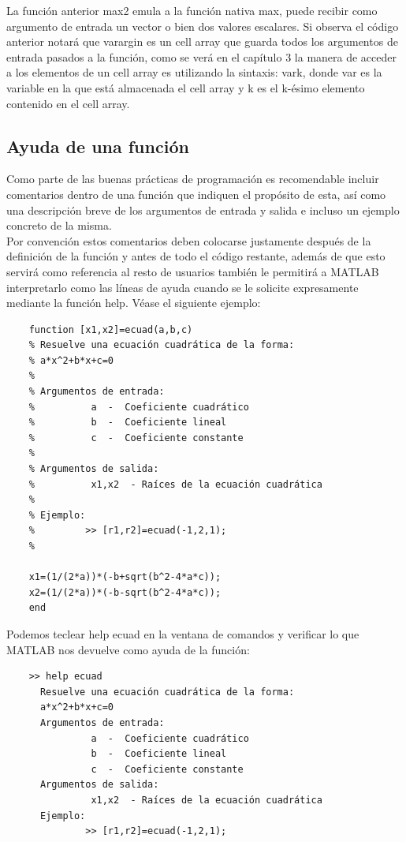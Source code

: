 La función anterior max2 emula a la función nativa  max, puede recibir como argumento 
de entrada un vector o bien dos valores escalares. Si observa el código anterior notará 
que varargin es un cell array que guarda todos los argumentos de entrada pasados a la 
función, como se verá en el capítulo 3 la manera de acceder a los elementos de un 
cell array es utilizando la sintaxis: var{k}, donde var es la variable en la que está 
almacenada el cell array y k es el k-ésimo elemento contenido en el cell array.

\subsection{Ayuda de una función}

Como parte de las buenas prácticas de programación es recomendable incluir comentarios 
dentro de una función que indiquen el propósito de esta, así como una descripción breve 
de los argumentos de entrada y salida e incluso un ejemplo concreto de la misma.\\

Por convención estos comentarios deben colocarse justamente después de la definición de 
la función y antes de todo el código restante, además de que esto servirá como referencia 
al resto de usuarios también le permitirá a MATLAB interpretarlo como las líneas de ayuda 
cuando se le solicite expresamente mediante la función help. Véase el siguiente ejemplo:

\begin{verbatim}
	function [x1,x2]=ecuad(a,b,c)
	% Resuelve una ecuación cuadrática de la forma:
	% a*x^2+b*x+c=0
	%
	% Argumentos de entrada:
	%          a  -  Coeficiente cuadrático
	%          b  -  Coeficiente lineal
	%          c  -  Coeficiente constante
	%
	% Argumentos de salida:
	%          x1,x2  - Raíces de la ecuación cuadrática 
	%
	% Ejemplo:
	%         >> [r1,r2]=ecuad(-1,2,1);
	%
	 
	x1=(1/(2*a))*(-b+sqrt(b^2-4*a*c));
	x2=(1/(2*a))*(-b-sqrt(b^2-4*a*c));
	end
\end{verbatim}

Podemos teclear help ecuad en la ventana de comandos y verificar lo que MATLAB nos 
devuelve como ayuda de la función:

\begin{verbatim}
	>> help ecuad
	  Resuelve una ecuación cuadrática de la forma:
	  a*x^2+b*x+c=0
	  Argumentos de entrada:
	           a  -  Coeficiente cuadrático
	           b  -  Coeficiente lineal
	           c  -  Coeficiente constante
	  Argumentos de salida:
	           x1,x2  - Raíces de la ecuación cuadrática 
	  Ejemplo:
	          >> [r1,r2]=ecuad(-1,2,1);
\end{verbatim}

